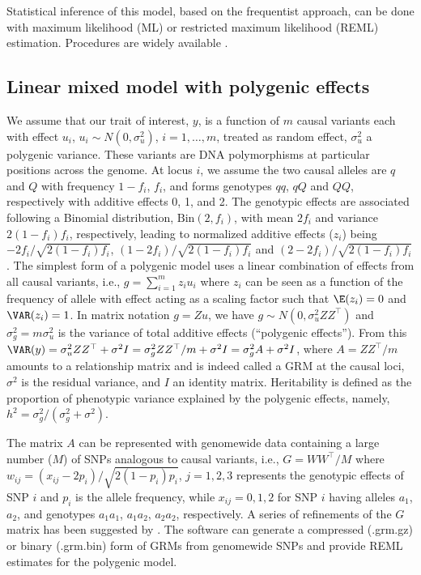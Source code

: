 \documentclass[article]{jss}
\begin{document}
Statistical inference of this model, based on the frequentist
approach, can be done with maximum likelihood (ML) or restricted
maximum likelihood (REML) estimation. Procedures are widely available
\citep[see][for further details]{sorensen02}.

\subsection{Linear mixed model with polygenic effects}

We assume that our trait of interest, $y$, is a function of $m$ causal
variants each with effect $u_i$, $u_i \sim N(0,\sigma_u^2)$,
$i=1,\ldots,m$, treated as random effect, $\sigma_u^2$ a polygenic
variance. These variants are DNA polymorphisms at particular positions
across the genome. At locus $i$, we assume the two causal alleles are
$q$ and $Q$ with frequency $1-f_i$, $f_i$, and forms genotypes $qq$,
$qQ$ and $QQ$, respectively with additive effects 0, 1, and 2. The
genotypic effects are associated following a Binomial distribution,
$\text{Bin}(2,f_i)$, with mean $2f_i$ and variance $2(1-f_i)f_i$,
respectively, leading to normalized additive effects ($z_i$) being
$-2f_i/\sqrt{2(1-f_i)f_i}$, $(1-2f_i)/\sqrt{2(1-f_i)f_i}$ and
$(2-2f_i)/\sqrt{2(1-f_i)f_i}$. The simplest form of a polygenic model
uses a linear combination of effects from all causal variants, i.e.,
$g=\sum_{i=1}^mz_iu_i$ where $z_i$ can be seen as a function of the
frequency of allele with effect acting as a scaling factor such that
$\E(z_i)=0$ and $\VAR(z_i)=1$. In matrix notation $g=Zu$, we have
$g\sim N(0,\sigma_u^2ZZ^\top)$ and $\sigma_g^2=m\sigma_u^2$ is the
variance of total additive effects (``polygenic effects''). From this
$\VAR(y)=\sigma_u^2ZZ^\top+\sigma^2I=\sigma_g^2ZZ^\top/m+\sigma^2I=\sigma_g^2A+\sigma^2I$,
where $A=ZZ^\top/m$ amounts to a relationship matrix and is indeed called
a GRM at the causal loci, $\sigma^2$ is the residual variance, and $I$
an identity matrix. Heritability is defined as the proportion of
phenotypic variance explained by the polygenic effects, namely,
$h^2 = \sigma_g^2 / (\sigma_g^2 + \sigma^2)$.

The matrix $A$ can be represented with genomewide data containing a large 
number ($M$) of SNPs analogous to causal variants, i.e., $G=WW^\top/M$ 
where $w_{ij}=(x_{ij}-2p_i)/\sqrt{2(1-p_i)p_i}$, $j=1,2,3$ represents the 
genotypic effects of SNP $i$ and $p_i$ is the allele frequency, while 
$x_{ij}=0, 1, 2$ for SNP $i$ having alleles $a_1$, $a_2$, and genotypes $a_1a_1$, $a_1a_2$, $a_2a_2$, 
respectively. A series of refinements of the $G$ matrix has been suggested 
by \cite{yang10}. The  software can generate a compressed (.grm.gz) 
or binary (.grm.bin) form of GRMs from genomewide SNPs and provide REML 
estimates for the polygenic model.
\end{document}
